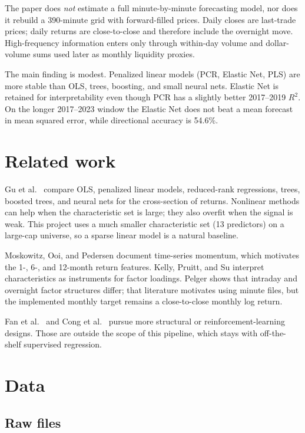 \documentclass[11pt,twocolumn]{article}
\begin{document}
The paper does \emph{not} estimate a full minute-by-minute forecasting model, nor does it rebuild a 390-minute grid with forward-filled prices. Daily closes are last-trade prices; daily returns are close-to-close and therefore include the overnight move. High-frequency information enters only through within-day volume and dollar-volume sums used later as monthly liquidity proxies.

The main finding is modest. Penalized linear models (PCR, Elastic Net, PLS) are more stable than OLS, trees, boosting, and small neural nets. Elastic Net is retained for interpretability even though PCR has a slightly better 2017--2019 $R^2$. On the longer 2017--2023 window the Elastic Net does not beat a mean forecast in mean squared error, while directional accuracy is 54.6\%.

\section{Related work}

Gu et al.\ \citep{GuKellyXiu2020} compare OLS, penalized linear models, reduced-rank regressions, trees, boosted trees, and neural nets for the cross-section of returns. Nonlinear methods can help when the characteristic set is large; they also overfit when the signal is weak. This project uses a much smaller characteristic set (13 predictors) on a large-cap universe, so a sparse linear model is a natural baseline.

Moskowitz, Ooi, and Pedersen \citep{MoskowitzOoiPedersen2011} document time-series momentum, which motivates the 1-, 6-, and 12-month return features. Kelly, Pruitt, and Su \citep{KellyPruittSu2018} interpret characteristics as instruments for factor loadings. Pelger \citep{Pelger2020} shows that intraday and overnight factor structures differ; that literature motivates using minute files, but the implemented monthly target remains a close-to-close monthly log return.

Fan et al.\ \citep{FanEtAl2022} and Cong et al.\ \citep{CongEtAl2020} pursue more structural or reinforcement-learning designs. Those are outside the scope of this pipeline, which stays with off-the-shelf supervised regression.

\section{Data}

\subsection{Raw files}
\end{document}
